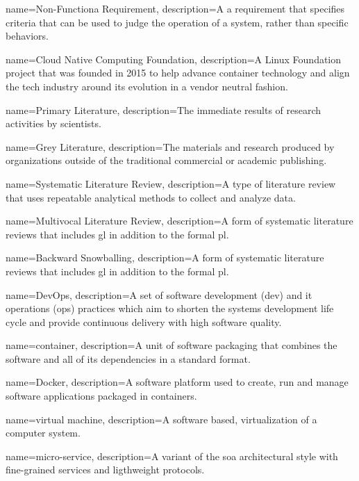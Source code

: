 {
    name={Non-Functiona Requirement},
    description={A a requirement that specifies criteria that can be used to judge the operation of a system, rather than specific behaviors.}
}

{
    name={Cloud Native Computing Foundation},
    description={A Linux Foundation project that was founded in 2015 to help advance container technology and align the tech industry around its evolution in a vendor neutral fashion.}
}

{
    name={Primary Literature},
    description={The immediate results of research activities by scientists.}
}

{
    name={Grey Literature},
    description={The materials and research produced by organizations outside of the traditional commercial or academic publishing.}
}

{
    name={Systematic Literature Review},
    description={A type of literature review that uses repeatable analytical methods to collect and analyze data.}
}

{
    name={Multivocal Literature Review},
    description={A form of systematic literature reviews that includes \gls{gl} in addition to the formal \gls{pl}.}
}

{
    name={Backward Snowballing},
    description={A form of systematic literature reviews that includes \gls{gl} in addition to the formal \gls{pl}.}
}

{
    name={DevOps},
    description={A set of software development (dev) and it operations (ops) practices which aim to shorten the systems development life cycle and provide continuous delivery with high software quality.}
}

{
    name={container},
    description={A unit of software packaging that combines the software and all of its dependencies in a standard format.}
}

{
    name={Docker},
    description={A software platform used to create, run and manage software applications packaged in \glspl{container}.}
}

{
    name={virtual machine},
    description={A software based, virtualization of a computer system.}
}

{
    name={micro-service},
    description={A variant of the \gls{soa} architectural style with fine-grained services and ligthweight protocols.}
}

